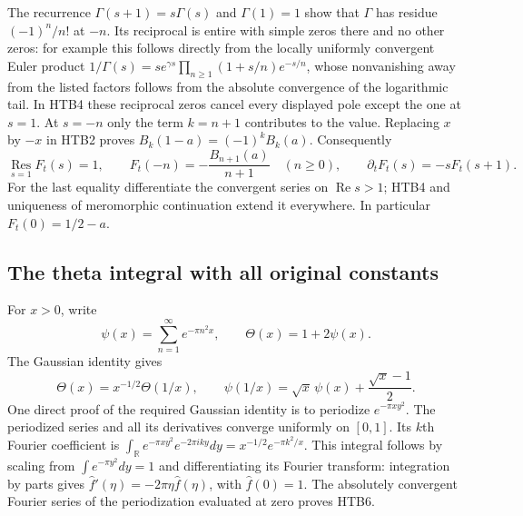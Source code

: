 The recurrence $\Gamma(s+1)=s\Gamma(s)$ and $\Gamma(1)=1$ show that
$\Gamma$ has residue $(-1)^n/n!$ at $-n$. Its reciprocal is entire with
simple zeros there and no other zeros: for example this follows directly
from the locally uniformly convergent Euler product
$1/\Gamma(s)=s e^{\gamma s}\prod_{n\ge1}(1+s/n)e^{-s/n}$, whose
nonvanishing away from the listed factors follows from the absolute
convergence of the logarithmic tail. In HTB4 these reciprocal zeros
cancel every displayed pole except the one at $s=1$. At $s=-n$ only
the term $k=n+1$ contributes to the value. Replacing $x$ by $-x$ in
HTB2 proves $B_k(1-a)=(-1)^k B_k(a)$. Consequently
\begin{equation}\tag{HTB5}
 \operatorname*{Res}_{s=1}F_t(s)=1,\qquad
 F_t(-n)=-\frac{B_{n+1}(a)}{n+1}\quad(n\ge0),\qquad
 \partial_t F_t(s)=-sF_t(s+1).
\end{equation}
For the last equality differentiate the convergent series on
$\operatorname{Re}s>1$; HTB4 and uniqueness of meromorphic continuation
extend it everywhere. In particular $F_t(0)=1/2-a$.

\subsection{The theta integral with all original constants}

For $x>0$, write
\[
 \psi(x)=\sum_{n=1}^{\infty}e^{-\pi n^2x},\qquad
 \Theta(x)=1+2\psi(x).
\]
The Gaussian identity gives
\begin{equation}\tag{HTB6}
 \Theta(x)=x^{-1/2}\Theta(1/x),\qquad
 \psi(1/x)=\sqrt{x}\,\psi(x)+\frac{\sqrt{x}-1}{2}.
\end{equation}
One direct proof of the required Gaussian identity is to periodize
$e^{-\pi x y^2}$. The periodized series and all its derivatives converge
uniformly on $[0,1]$. Its $k$th Fourier coefficient is
$\int_{\mathbb R}e^{-\pi x y^2}e^{-2\pi i k y}dy
=x^{-1/2}e^{-\pi k^2/x}$. This integral follows by scaling from
$\int e^{-\pi y^2}dy=1$ and differentiating its Fourier transform:
integration by parts gives $\widehat f'(\eta)=-2\pi\eta\widehat f(\eta)$,
with $\widehat f(0)=1$. The absolutely convergent Fourier series of the
periodization evaluated at zero proves HTB6.


